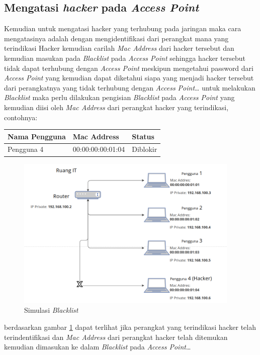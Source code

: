 \documentclass[a4paper, 12pt]{article}
\begin{document}
\subsection{Mengatasi \textit{hacker} pada \textit{Access Point}}
Kemudian untuk mengatasi hacker yang terhubung pada jaringan maka cara mengatasinya adalah dengan mengidentifikasi dari perangkat mana yang terindikasi Hacker kemudian carilah \textit{Mac Address} dari hacker tersebut dan kemudian masukan pada \textit{Blacklist} pada \textit{Access Point} sehingga hacker tersebut tidak dapat terhubung dengan \textit{Access Point} meskipun mengetahui password dari \textit{Access Point} yang kemudian dapat diketahui siapa yang menjadi hacker tersebut dari perangkatnya yang tidak terhubung dengan \textit{Access Point}\dots
untuk melakukan \textit{Blacklist} maka perlu dilakukan pengisian \textit{Blacklist} pada \textit{Access Point} yang kemudian diisi oleh \textit{Mac Address} dari perangkat hacker yang terindikasi, contohnya:
\begin{table}[H]
  \begin{tabular}{|l|l|l|}
    \hline
    Nama Pengguna & Mac Address       & Status   \\ \hline
    Pengguna 4    & 00:00:00:00:01:04 & Diblokir \\ \hline
  \end{tabular}
\end{table}
\begin{figure}[H]
  \begin{center}
    \includegraphics[width=0.95\textwidth]{images/Gambar3.png}
  \end{center}
  \caption{Simulasi \textit{Blacklist}}\label{fig:hacker}
\end{figure}
berdasarkan gambar \ref{fig:hacker} dapat terlihat jika perangkat yang terindikasi hacker telah terindentifikasi dan \textit{Mac Address} dari perangkat hacker telah ditemukan kemudian dimasukan ke dalam \textit{Blacklist} pada \textit{Access Point}\dots
\end{document}
